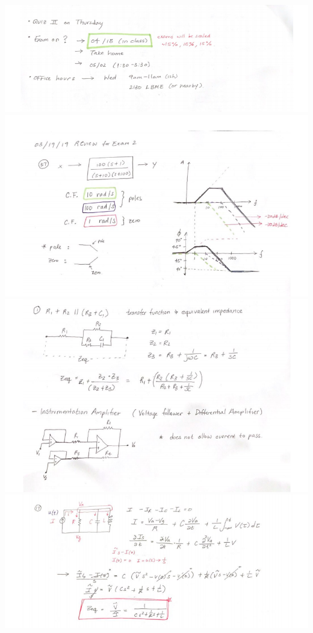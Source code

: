 \documentclass[11pt]{book}
\begin{document}
\includegraphics[width=\textwidth]{figures/3-19_Board1.png}
\\
\includegraphics[width=\textwidth]{figures/3-19_Board2.png}
\\
\includegraphics[width=\textwidth]{figures/3-19_Board3.png}
\\
\includegraphics[width=\textwidth]{figures/3-19_Board4.png}
\end{document}
